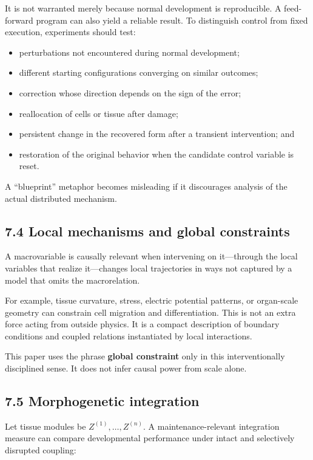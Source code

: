 \documentclass[
  11pt,
]{article}
\providecommand{\tightlist}{%
  \setlength{\itemsep}{0pt}\setlength{\parskip}{0pt}}
\begin{document}
It is not warranted merely because normal development is reproducible. A
feed-forward program can also yield a reliable result. To distinguish
control from fixed execution, experiments should test:

\begin{itemize}
\tightlist
\item
  perturbations not encountered during normal development;
\item
  different starting configurations converging on similar outcomes;
\item
  correction whose direction depends on the sign of the error;
\item
  reallocation of cells or tissue after damage;
\item
  persistent change in the recovered form after a transient
  intervention; and
\item
  restoration of the original behavior when the candidate control
  variable is reset.
\end{itemize}

A ``blueprint'' metaphor becomes misleading if it discourages analysis
of the actual distributed mechanism.

\subsection{7.4 Local mechanisms and global
constraints}\label{local-mechanisms-and-global-constraints}

A macrovariable is causally relevant when intervening on it---through
the local variables that realize it---changes local trajectories in ways
not captured by a model that omits the macrorelation.

For example, tissue curvature, stress, electric potential patterns, or
organ-scale geometry can constrain cell migration and differentiation.
This is not an extra force acting from outside physics. It is a compact
description of boundary conditions and coupled relations instantiated by
local interactions.

This paper uses the phrase \textbf{global constraint} only in this
interventionally disciplined sense. It does not infer causal power from
scale alone.

\subsection{7.5 Morphogenetic
integration}\label{morphogenetic-integration}

Let tissue modules be \(Z^{(1)},\dots,Z^{(n)}\). A maintenance-relevant
integration measure can compare developmental performance under intact
and selectively disrupted coupling:
\end{document}
